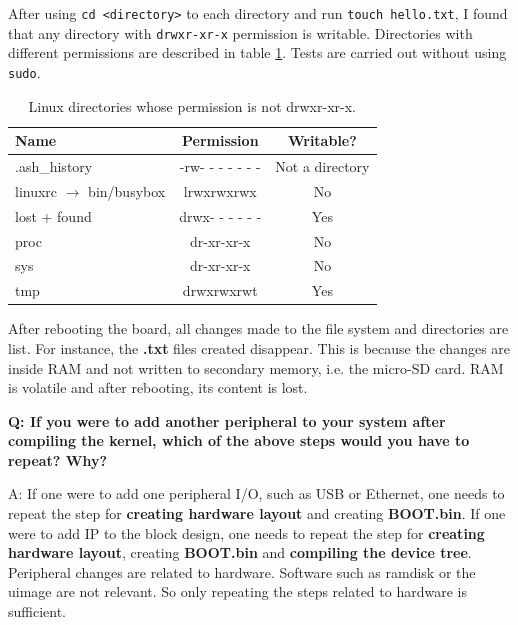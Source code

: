 \documentclass[11pt,letterpaper,titlepage]{article}
\begin{document}
After using \verb|cd <directory>| to each directory and run \verb|touch hello.txt|, I found that any directory with \verb|drwxr-xr-x| permission is writable. Directories with different permissions are described in table \ref{permission_table}. Tests are carried out without using \verb|sudo|.

\newpage

\begin{table}[h!]
\centering
\begin{tabular}{@{}lcc@{}}
\toprule
Name                              & Permission & Writable? \\ \midrule
.ash\_history                     & -rw- - - - - - - & Not a directory          \\ \midrule
linuxrc $\rightarrow$ bin/busybox & lrwxrwxrwx & No        \\ \midrule
lost + found                      & drwx- - - - - - & Yes          \\ \midrule
proc                              & dr-xr-xr-x & No          \\ \midrule
sys                               & dr-xr-xr-x & No          \\ \midrule
tmp                               & drwxrwxrwt & Yes       \\ \bottomrule
\end{tabular}
\caption{Linux directories whose permission is not drwxr-xr-x.}
\label{permission_table}
\end{table}

After rebooting the board, all changes made to the file system and directories are list. For instance, the \textbf{.txt} files created disappear. This is because the changes are inside RAM and not written to secondary memory, i.e. the micro-SD card. RAM is volatile and after rebooting, its content is lost.

\textbf{Q: If you were to add another peripheral to your system after compiling the kernel, which of the above steps would you have to repeat? Why?}

A: If one were to add one peripheral I/O, such as USB or Ethernet, one needs to repeat the step for \textbf{creating hardware layout} and creating \textbf{BOOT.bin}. If one were to add IP to the block design, one needs to repeat the step for \textbf{creating hardware layout}, creating \textbf{BOOT.bin} and \textbf{compiling the device tree}. Peripheral changes are related to hardware. Software such as ramdisk or the uimage are not relevant. So only repeating the steps related to hardware is sufficient.
\end{document}
